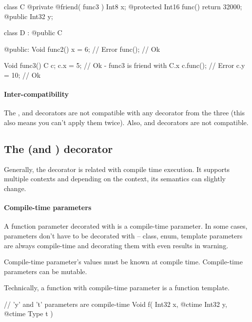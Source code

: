 \begin{code}
class C {
	@private @friend( func3 ) Int8 x;
	@protected Int16 func() {
		return 32000;
	}	
	@public Int32 y;
}

class D : @public C {
	
@public:
	Void func2() {
		x = 6; // Error
		func(); // Ok
	}
	
}

Void func3() {
	C c;
	c.x = 5; // Ok - func3 is friend with C.x
	c.func(); // Error
	c.y = 10; // Ok
}
\end{code}

\paragraph{Inter-compatibility}
The ,  and  decorators are not compatible with any decorator from the three (this also means you can't apply them twice). Also,  and  decorators are not compatible.

\subsection{The  (and ) decorator} \label{decorator:ctime}
Generally, the  decorator is related with compile time execution. It supports multiple contexts and depending on the context, its semantics can slightly change.

\paragraph{Compile-time parameters}
A function parameter decorated with  is a compile-time parameter. In some cases, parameters don't have to be decorated with  -- class, enum, template parameters are always compile-time and decorating them with  even results in warning.

Compile-time parameter's values must be known at compile time. Compile-time parameters can be mutable.

Technically, a function with compile-time parameter is a function template.

\begin{code}
// 'y' and 't' parameters are compile-time
Void f( Int32 x, @ctime Int32 y, @ctime Type t ) {
	
}
\end{code}

